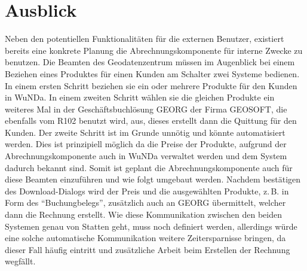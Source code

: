 \section{Ausblick}
Neben den potentiellen Funktionalitäten für die externen Benutzer, existiert bereits eine konkrete Planung die Abrechnungskomponente für interne Zwecke zu benutzen.
Die Beamten des Geodatenzentrum müssen im Augenblick bei einem Beziehen eines Produktes für einen Kunden am Schalter zwei Systeme bedienen.
In einem ersten Schritt beziehen sie ein oder mehrere Produkte für den Kunden in \ac{WuNDa}.
In einem zweiten Schritt wählen sie die gleichen Produkte ein weiteres Mal in der Geschäftsbuchlösung GEORG der Firma GEOSOFT, die ebenfalls vom R102 benutzt wird, aus, dieses erstellt dann die Quittung für den Kunden.
Der zweite Schritt ist im Grunde unnötig und könnte automatisiert werden.
Dies ist prinzipiell möglich da die Preise der Produkte, aufgrund der Abrechnungskomponente auch in \ac{WuNDa} verwaltet werden und dem System dadurch bekannt sind.
Somit ist geplant die Abrechnungskomponente auch für diese Beamten einzuführen und wie folgt umgebaut werden.
Nachdem bestätigen des Download-Dialogs wird der Preis und die ausgewählten Produkte, z.\,B. in Form des \enquote{Buchungbelegs}, zusätzlich auch an GEORG übermittelt, welcher dann die Rechnung erstellt.
Wie diese Kommunikation zwischen den beiden Systemen genau von Statten geht, muss noch definiert werden, allerdings würde eine solche automatische Kommunikation weitere Zeitersparnisse bringen, da dieser Fall häufig eintritt und zusätzliche Arbeit beim Erstellen der Rechnung wegfällt.




